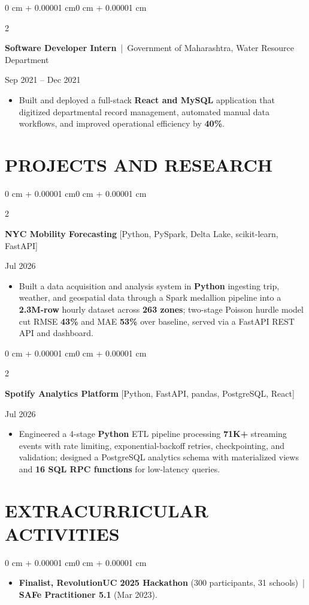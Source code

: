 \documentclass[10pt, letterpaper]{article}
\newenvironment{highlights}{
    \begin{itemize}[
        topsep=0.10 cm,
        parsep=0.06 cm,
        partopsep=0pt,
        itemsep=0.06 cm,
        leftmargin=12pt
    ]
}{
    \end{itemize}
}
\newenvironment{onecolentry}{
    \begin{adjustwidth}{0 cm + 0.00001 cm}{0 cm + 0.00001 cm}
}{
    \end{adjustwidth}
}
\newenvironment{twocolentry}[2][]{
    \onecolentry
    \def\secondColumn{#2}
    \setcolumnwidth{\fill, 4.5 cm}
    \begin{paracol}{2}
}{
    \switchcolumn \raggedleft \secondColumn
    \end{paracol}
    \endonecolentry
}
\begin{document}
\vspace{0.15 cm}

\begin{twocolentry}{Sep 2021 -- Dec 2021}
\textbf{Software Developer Intern} \,|\, Government of Maharashtra, Water Resource Department
\end{twocolentry}
\begin{highlights}
  \item Built and deployed a full-stack \textbf{React and MySQL} application that digitized departmental record management, automated manual data workflows, and improved operational efficiency by \textbf{40\%}.
\end{highlights}

\section{PROJECTS AND RESEARCH}
\begin{twocolentry}{Jul 2026}
\textbf{NYC Mobility Forecasting} [Python, PySpark, Delta Lake, scikit-learn, FastAPI]
\end{twocolentry}
\begin{highlights}
  \item Built a data acquisition and analysis system in \textbf{Python} ingesting trip, weather, and geospatial data through a Spark medallion pipeline into a \textbf{2.3M-row} hourly dataset across \textbf{263 zones}; two-stage Poisson hurdle model cut RMSE \textbf{43\%} and MAE \textbf{53\%} over baseline, served via a FastAPI REST API and dashboard.
\end{highlights}

\vspace{0.12 cm}

\begin{twocolentry}{Jul 2026}
\textbf{Spotify Analytics Platform} [Python, FastAPI, pandas, PostgreSQL, React]
\end{twocolentry}
\begin{highlights}
  \item Engineered a 4-stage \textbf{Python} ETL pipeline processing \textbf{71K+} streaming events with rate limiting, exponential-backoff retries, checkpointing, and validation; designed a PostgreSQL analytics schema with materialized views and \textbf{16 SQL RPC functions} for low-latency queries.
\end{highlights}

\section{EXTRACURRICULAR ACTIVITIES}
\begin{onecolentry}
\begin{highlights}
  \item \textbf{Finalist, RevolutionUC 2025 Hackathon} (300 participants, 31 schools) \,|\, \textbf{SAFe Practitioner 5.1} (Mar 2023).
\end{highlights}
\end{onecolentry}
\end{document}
